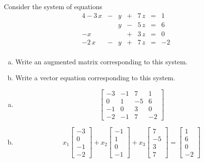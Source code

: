 
\begin{exerciseStatement}


 Consider the system of equations 
\begin{alignat*}{4} -3 \, x &-& y &+& 7 \, z &=& 1 \\ & & y &-& 5 \, z &=& 6 \\-x & &  &+& 3 \, z &=& 0 \\-2 \, x &-& y &+& 7 \, z &=& -2 \\ \end{alignat*}
            


\begin{enumerate}[(a)]
\item  Write an augmented matrix corresponding to this system. 
\item  Write a vector equation corresponding to this system. 
\end{enumerate}
    
\end{exerciseStatement}
    
\begin{exerciseAnswer} 

\begin{enumerate}[(a)]
\item \[ \left[\begin{array}{ccc|c}
-3 & -1 & 7 & 1 \\
0 & 1 & -5 & 6 \\
-1 & 0 & 3 & 0 \\
-2 & -1 & 7 & -2
\end{array}\right] \]
\item \[ x_{1} \left[\begin{array}{c}
-3 \\
0 \\
-1 \\
-2
\end{array}\right] + x_{2} \left[\begin{array}{c}
-1 \\
1 \\
0 \\
-1
\end{array}\right] + x_{3} \left[\begin{array}{c}
7 \\
-5 \\
3 \\
7
\end{array}\right] = \left[\begin{array}{c}
1 \\
6 \\
0 \\
-2
\end{array}\right] \]
\end{enumerate}
    
\end{exerciseAnswer}
    
